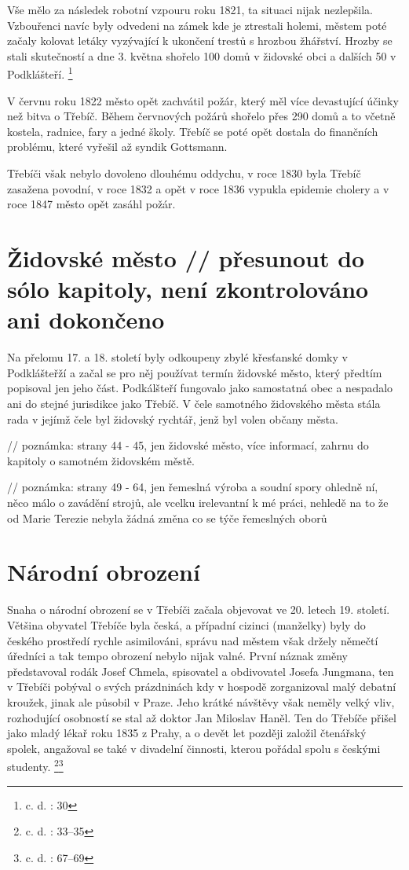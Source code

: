 \documentclass[a4paper,oneside,12p]{report}
\begin{document}
Vše mělo za následek robotní vzpouru roku 1821, ta situaci nijak nezlepšila.
Vzbouřenci navíc byly odvedeni na zámek kde je ztrestali holemi, městem poté začaly kolovat letáky vyzývající k ukončení trestů s hrozbou žhářství.
Hrozby se stali skutečností a dne 3. května shořelo 100 domů v židovské obci a dalších 50 v Podklášteří. \footnote{c. d. : 30}

V červnu roku 1822 město opět zachvátil požár, který měl více devastující účinky než bitva o Třebíč.
Během červnových požárů shořelo přes 290 domů a to včetně kostela, radnice, fary a jedné školy.
Třebíč se poté opět dostala do finančních problému, které vyřešil až syndik Gottsmann.

Třebíči však nebylo dovoleno dlouhému oddychu, v roce 1830 byla Třebíč zasažena povodní, v roce 1832 a opět v roce 1836 vypukla epidemie cholery a v roce 1847 město opět zasáhl požár.

\section{Židovské město // přesunout do sólo kapitoly, není zkontrolováno ani dokončeno}

Na přelomu 17. a 18. století byly odkoupeny zbylé křesťanské domky v Podklášteřží a začal se pro něj používat termín židovské město, který předtím popisoval jen jeho část.
Podkálšteří fungovalo jako samostatná obec a nespadalo ani do stejné jurisdikce jako Třebíč.
V čele samotného židovského města stála rada v jejímž čele byl židovský rychtář, jenž byl volen občany města.

// poznámka: strany 44 - 45, jen židovské město, více informací, zahrnu do kapitoly o samotném židovském městě.


// poznámka: strany 49 - 64, jen řemeslná výroba a soudní spory ohledně ní, něco málo o zavádění strojů, ale vcelku irelevantní k mé práci, nehledě na to že od Marie Terezie nebyla žádná změna co se týče řemeslných oborů

\section{Národní obrození}

Snaha o národní obrození se v Třebíči začala objevovat ve 20. letech 19. století.
Většina obyvatel Třebíče byla česká, a případní cizinci (manželky) byly do českého prostředí rychle asimilováni, správu nad městem však držely němečtí úředníci a tak tempo obrození nebylo nijak valné.
První náznak změny představoval rodák Josef Chmela, spisovatel a obdivovatel Josefa Jungmana, ten v Třebíči pobýval o svých prázdninách kdy v hospodě zorganizoval malý debatní kroužek, jinak ale působil v Praze.
Jeho krátké návštěvy však neměly velký vliv, rozhodující osobností se stal až doktor Jan Miloslav Haněl.
Ten do Třebíče přišel jako mladý lékař roku 1835 z Prahy, a o devět let později založil čtenářský spolek, angažoval se také v divadelní činnosti, kterou pořádal spolu s českými studenty. \footnote{c. d. : 33--35}\footnote{c. d. : 67--69}
\end{document}
